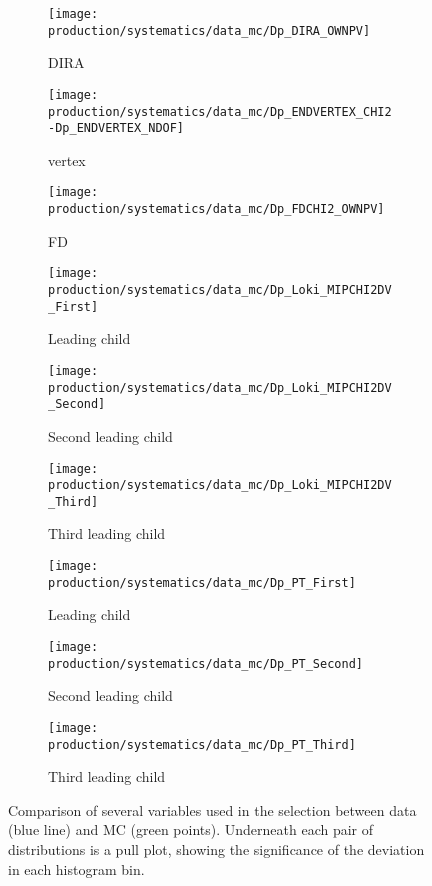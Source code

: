 \begin{figure}
  \begin{subfigure}{0.3\textwidth}
    \centering
    \texttt{[image: production/systematics/data\_mc/Dp\_DIRA\_OWNPV]}
    \caption{\PDplus \ac{DIRA}}
  \end{subfigure}
  \begin{subfigure}{0.3\textwidth}
    \centering
    \texttt{[image: production/systematics/data\_mc/Dp\_ENDVERTEX\_CHI2-Dp\_ENDVERTEX\_NDOF]}
    \caption{\PDplus vertex \chisq}
  \end{subfigure}
  \begin{subfigure}{0.3\textwidth}
    \centering
    \texttt{[image: production/systematics/data\_mc/Dp\_FDCHI2\_OWNPV]}
    \caption{\PDzero FD \chisq}
  \end{subfigure}

  \begin{subfigure}{0.3\textwidth}
    \centering
    \texttt{[image: production/systematics/data\_mc/Dp\_Loki\_MIPCHI2DV\_First]}
    \caption{Leading child \ipchisq}
  \end{subfigure}
  \begin{subfigure}{0.3\textwidth}
    \centering
    \texttt{[image: production/systematics/data\_mc/Dp\_Loki\_MIPCHI2DV\_Second]}
    \caption{Second leading child \ipchisq}
  \end{subfigure}
  \begin{subfigure}{0.3\textwidth}
    \centering
    \texttt{[image: production/systematics/data\_mc/Dp\_Loki\_MIPCHI2DV\_Third]}
    \caption{Third leading child \ipchisq}
  \end{subfigure}

  \begin{subfigure}{0.3\textwidth}
    \centering
    \texttt{[image: production/systematics/data\_mc/Dp\_PT\_First]}
    \caption{Leading child \pT}
  \end{subfigure}
  \begin{subfigure}{0.3\textwidth}
    \centering
    \texttt{[image: production/systematics/data\_mc/Dp\_PT\_Second]}
    \caption{Second leading child \pT}
  \end{subfigure}
  \begin{subfigure}{0.3\textwidth}
    \centering
    \texttt{[image: production/systematics/data\_mc/Dp\_PT\_Third]}
    \caption{Third leading child \pT}
  \end{subfigure}

  \caption{%
    Comparison of several variables used in the \DpToKpipi selection between
    data (blue line) and \ac{MC} (green points).
    Underneath each pair of distributions is a pull plot, showing the
    significance of the deviation in each histogram bin.
  }
  \label{fig:prod:syst:mc:DpToKpipi}
\end{figure}

